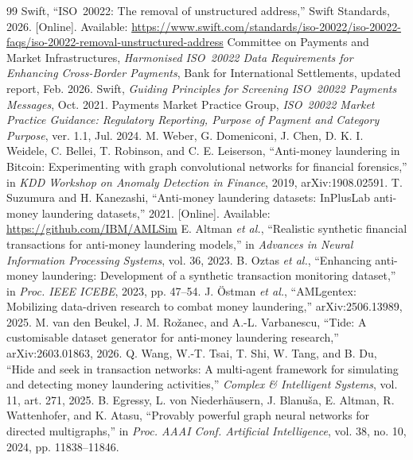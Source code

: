 \documentclass[conference]{IEEEtran}
\begin{document}
\balance
\begin{thebibliography}{99}
\scriptsize
\setlength{\itemsep}{0pt plus 0.2pt}
Swift, ``ISO~20022: The removal of unstructured address,'' Swift Standards,
2026. [Online]. Available:
\url{https://www.swift.com/standards/iso-20022/iso-20022-faqs/iso-20022-removal-unstructured-address}
Committee on Payments and Market Infrastructures, \emph{Harmonised ISO~20022
Data Requirements for Enhancing Cross-Border Payments}, Bank for International
Settlements, updated report, Feb. 2026.
Swift, \emph{Guiding Principles for Screening ISO~20022 Payments Messages},
Oct. 2021.
Payments Market Practice Group, \emph{ISO~20022 Market Practice Guidance:
Regulatory Reporting, Purpose of Payment and Category Purpose}, ver. 1.1, Jul.
2024.
M. Weber, G. Domeniconi, J. Chen, D. K. I. Weidele, C. Bellei, T. Robinson,
and C. E. Leiserson, ``Anti-money laundering in Bitcoin: Experimenting with
graph convolutional networks for financial forensics,'' in \emph{KDD Workshop
on Anomaly Detection in Finance}, 2019, arXiv:1908.02591.
T. Suzumura and H. Kanezashi, ``Anti-money laundering datasets: InPlusLab
anti-money laundering datasets,'' 2021. [Online]. Available:
\url{https://github.com/IBM/AMLSim}
E. Altman \emph{et al.}, ``Realistic synthetic financial transactions for
anti-money laundering models,'' in \emph{Advances in Neural Information
Processing Systems}, vol. 36, 2023.
B. Oztas \emph{et al.}, ``Enhancing anti-money laundering: Development of a
synthetic transaction monitoring dataset,'' in \emph{Proc. IEEE ICEBE}, 2023,
pp. 47--54.
J. \"Ostman \emph{et al.}, ``AMLgentex: Mobilizing data-driven research to
combat money laundering,'' arXiv:2506.13989, 2025.
M. van den Beukel, J. M. Ro\v{z}anec, and A.-L. Varbanescu, ``Tide: A
customisable dataset generator for anti-money laundering research,''
arXiv:2603.01863, 2026.
Q. Wang, W.-T. Tsai, T. Shi, W. Tang, and B. Du, ``Hide and seek in
transaction networks: A multi-agent framework for simulating and detecting
money laundering activities,'' \emph{Complex \& Intelligent Systems}, vol. 11,
art. 271, 2025.
B. Egressy, L. von Niederh\"ausern, J. Blanu\v{s}a, E. Altman, R. Wattenhofer,
and K. Atasu, ``Provably powerful graph neural networks for directed
multigraphs,'' in \emph{Proc. AAAI Conf. Artificial Intelligence}, vol. 38,
no. 10, 2024, pp. 11838--11846.

\end{thebibliography}
\end{document}
